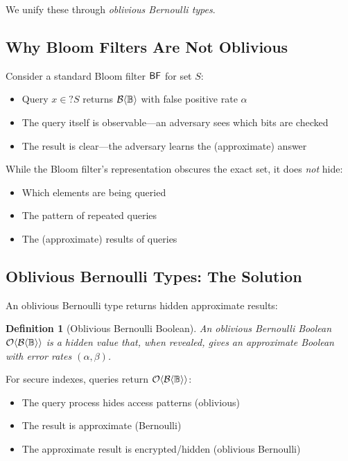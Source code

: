 \documentclass[11pt,final,hidelinks]{article}
\newcommand{\BernBool}{\mathcal{B}\langle \Bool \rangle}
\newcommand{\fprate}{\alpha}
\newcommand{\fnrate}{\beta}
\newtheorem{definition}[theorem]{Definition}
\begin{document}
We unify these through \emph{oblivious Bernoulli types}.

\subsection{Why Bloom Filters Are Not Oblivious}

Consider a standard Bloom filter $\mathsf{BF}$ for set $S$:
\begin{itemize}
    \item Query $x \in? S$ returns $\BernBool$ with false positive rate $\fprate$
    \item The query itself is observable—an adversary sees which bits are checked
    \item The result is clear—the adversary learns the (approximate) answer
\end{itemize}

While the Bloom filter's representation obscures the exact set, it does \emph{not} hide:
\begin{itemize}
    \item Which elements are being queried
    \item The pattern of repeated queries
    \item The (approximate) results of queries
\end{itemize}

\subsection{Oblivious Bernoulli Types: The Solution}

An oblivious Bernoulli type returns hidden approximate results:

\begin{definition}[Oblivious Bernoulli Boolean]
An oblivious Bernoulli Boolean $\Obv{\BernBool}$ is a hidden value that, when revealed, gives an approximate Boolean with error rates $(\fprate, \fnrate)$.
\end{definition}

For secure indexes, queries return $\Obv{\BernBool}$:
\begin{itemize}
    \item The query process hides access patterns (oblivious)
    \item The result is approximate (Bernoulli)
    \item The approximate result is encrypted/hidden (oblivious Bernoulli)
\end{itemize}
\end{document}
